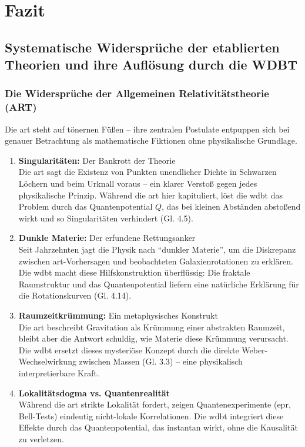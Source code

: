 \chapter{Fazit}
\section{Systematische Widersprüche der etablierten Theorien und ihre Auflösung durch die WDBT}
\subsection{Die Widersprüche der Allgemeinen Relativitätstheorie (ART)}
Die \gls{art} steht auf tönernen Füßen – ihre zentralen Postulate entpuppen sich bei genauer Betrachtung als mathematische Fiktionen ohne physikalische Grundlage.
\begin{enumerate}
    \item \textbf{Singularitäten:} Der Bankrott der Theorie\\Die \gls{art} sagt die Existenz von Punkten unendlicher Dichte in Schwarzen Löchern und beim Urknall voraus – ein klarer Verstoß gegen jedes physikalische Prinzip. Während die \gls{art} hier kapituliert, löst die \gls{wdbt} das Problem durch das Quantenpotential $Q$, das bei kleinen Abständen abstoßend wirkt und so Singularitäten verhindert (Gl. 4.5).
    \item \textbf{Dunkle Materie:} Der erfundene Rettungsanker\\Seit Jahrzehnten jagt die Physik nach \enquote{dunkler Materie}, um die Diskrepanz zwischen \gls{art}-Vorhersagen und beobachteten Galaxienrotationen zu erklären. Die \gls{wdbt} macht diese Hilfskonstruktion überflüssig: Die fraktale Raumstruktur und das Quantenpotential liefern eine natürliche Erklärung für die Rotationskurven (Gl. 4.14).
    \item \textbf{Raumzeitkrümmung:} Ein metaphysisches Konstrukt\\Die \gls{art} beschreibt Gravitation als Krümmung einer abstrakten Raumzeit, bleibt aber die Antwort schuldig, wie Materie diese Krümmung verursacht. Die \gls{wdbt} ersetzt dieses mysteriöse Konzept durch die direkte Weber-Wechselwirkung zwischen Massen (Gl. 3.3) – eine physikalisch interpretierbare Kraft.
    \item \textbf{Lokalitätsdogma vs. Quantenrealität}\\Während die \gls{art} strikte Lokalität fordert, zeigen Quantenexperimente (\gls{epr}, Bell-Tests) eindeutig nicht-lokale Korrelationen. Die \gls{wdbt} integriert diese Effekte durch das Quantenpotential, das instantan wirkt, ohne die Kausalität zu verletzen.
\end{enumerate}
